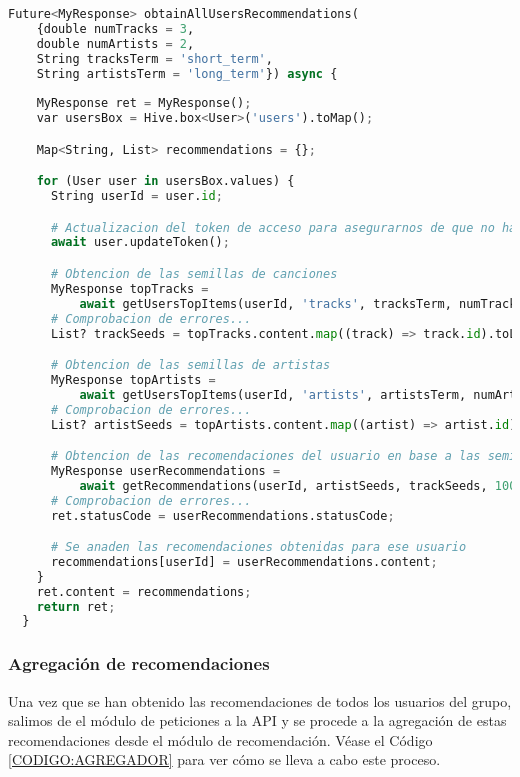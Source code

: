 \begin{lstlisting}[language=python, caption=Obtención de recomendaciones para un usuario, label=CODIGO:OBTENCION_RECOMENDACIONES]
  Future<MyResponse> obtainAllUsersRecommendations(
    {double numTracks = 3,
    double numArtists = 2,
    String tracksTerm = 'short_term',
    String artistsTerm = 'long_term'}) async {
    
    MyResponse ret = MyResponse();
    var usersBox = Hive.box<User>('users').toMap();

    Map<String, List> recommendations = {};

    for (User user in usersBox.values) {
      String userId = user.id;

      # Actualizacion del token de acceso para asegurarnos de que no haya problemas
      await user.updateToken();

      # Obtencion de las semillas de canciones
      MyResponse topTracks =
          await getUsersTopItems(userId, 'tracks', tracksTerm, numTracks);
      # Comprobacion de errores...
      List? trackSeeds = topTracks.content.map((track) => track.id).toList();

      # Obtencion de las semillas de artistas
      MyResponse topArtists =
          await getUsersTopItems(userId, 'artists', artistsTerm, numArtists);
      # Comprobacion de errores...
      List? artistSeeds = topArtists.content.map((artist) => artist.id).toList();

      # Obtencion de las recomendaciones del usuario en base a las semillas obtenidas
      MyResponse userRecommendations =
          await getRecommendations(userId, artistSeeds, trackSeeds, 100);
      # Comprobacion de errores...
      ret.statusCode = userRecommendations.statusCode;

      # Se anaden las recomendaciones obtenidas para ese usuario
      recommendations[userId] = userRecommendations.content;
    }
    ret.content = recommendations;
    return ret;
  }
\end{lstlisting}


\subsubsection{Agregación de recomendaciones\label{subsec:agregacion_recomendaciones_implementacion}}

Una vez que se han obtenido las recomendaciones de todos los usuarios del grupo, salimos de el módulo de peticiones a la API 
y se procede a la agregación de estas recomendaciones desde el módulo de recomendación. Véase el Código \ref{CODIGO:AGREGADOR} 
para ver cómo se lleva a cabo este proceso. 

